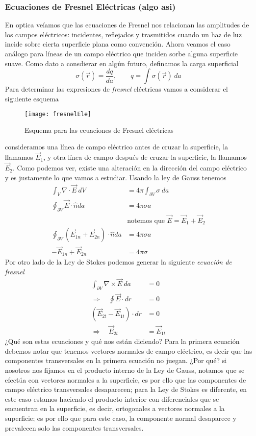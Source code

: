 \documentclass[11pt,a4paper]{article}
\begin{document}
\subsubsection{Ecuaciones de Fresnel Eléctricas (algo asi)}
En optica veíamos que las ecuaciones de Fresnel nos relacionan las amplitudes de los campos eléctricos: incidentes, reflejados y trasmitidos cuando un haz de luz incide sobre cierta superficie plana como convención. Ahora veamos el caso análogo para líneas de un campo eléctrico que inciden sorbe alguna superficie suave. Como dato a consdierar en algún futuro, definamos la carga superficial
$$\sigma(\vec{r})=\frac{dq}{da},\qquad q=\int\sigma(\vec{r})\ da$$
Para determinar las expresiones de \emph{fresnel} eléctricas vamos a considerar el siguiente esquema
\begin{figure}[h!]
\centering
\texttt{[image: fresnelEle]}
\caption{Esquema para las ecuaciones de Fresnel eléctricas}
\label{fig:esquema}
\end{figure}

consideramos una línea de campo eléctrico antes de cruzar la superficie, la llamamos $\vec{E}_1$, y otra línea de campo después de cruzar la superficie, la llamamos $\vec{E}_2$. Como podemos ver, existe una alteración en la dirección del campo eléctrico y es justamente lo que vamos a estudiar. Usando la ley de Gauss tenemos
\begin{align*}
\int_V\nabla\cdot\vec{E}\ dV&=4\pi\int_{\partial V}\sigma\ da\\
\oint_{\partial V}\vec{E}\cdot\hat{n}da&=4\pi\sigma a\\
&\text{notemos que $\vec{E}=\vec{E}_1+\vec{E}_2$}\\
\oint_{\partial V}\left(\vec{E}_{1n}+\vec{E}_{2n}\right)\cdot\hat{n}da&=4\pi\sigma a\\
-\vec{E}_{1n}+\vec{E}_{2n}&=4\pi\sigma 
\end{align*}
Por otro lado de la Ley de Stokes podemos generar la siguiente \emph{ecuación de fresnel}
\begin{align*}
\int_{\partial V}\nabla\times\vec{E}\ da&=0\\
\Longrightarrow\quad \oint\vec{E}\cdot dr&=0\\
\left(\vec{E}_{2t}-\vec{E}_{1t}\right)\cdot dr&=0\\
\Rightarrow\quad\vec{E}_{2t}&=\vec{E}_{1t}
\end{align*}
¿Qué son estas ecuaciones y qué nos están diciendo? Para la primera ecuación debemos notar que tenemos vectores normales de campo eléctrico, es decir que las componentes transversales en la primera ecuación no juegan. ¿Por qué? si nosotros nos fijamos en el producto interno de la Ley de Gauss, notamos que se efectúa con vectores normales a la superficie, es por ello que las componentes de campo eléctrico transversales desaparecen; para la Ley de Stokes es diferente, en este caso estamos haciendo el producto interior con diferenciales que se encuentran en la superficie, es decir, ortogonales a vectores normales a la superficie; es por ello que para este caso, la componente normal desaparece y prevalecen solo las componentes transversales.
\end{document}
